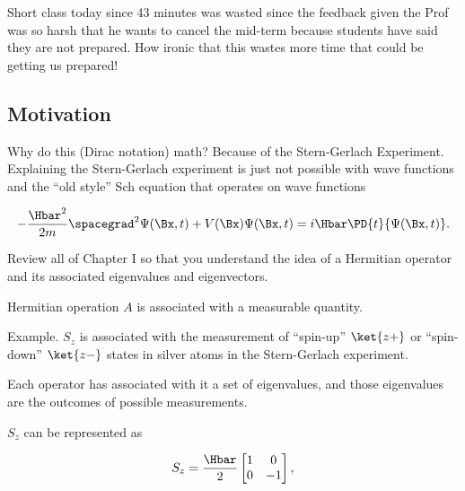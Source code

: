 %
%

Short class today since 43 minutes was wasted since the feedback given the Prof was so harsh that he wants to cancel the mid-term because students have said they are not prepared.  How ironic that this wastes more time that could be getting us prepared!

\subsection{Motivation}

Why do this (Dirac notation) math?  Because of the Stern-Gerlach Experiment.  Explaining the Stern-Gerlach experiment is just not possible with wave functions and the ``old style'' Sch equation that operates on wave functions

\begin{equation}\label{eqn:PHY356Foct26:100}
\begin{aligned}
- \frac{\Hbar^2}{2m} \spacegrad^2 \Psi(\Bx,t) + V(\Bx) \Psi(\Bx,t) = i \Hbar \PD{t}{\Psi(\Bx,t)}.
\end{aligned}
\end{equation}

Review all of Chapter I so that you understand the idea of a Hermitian operator and its associated eigenvalues and eigenvectors.

Hermitian operation \(A\) is associated with a measurable quantity.

Example.  \(S_z\) is associated with the measurement of ``spin-up'' \(\ket{z+}\) or ``spin-down'' \(\ket{z-}\) states in silver atoms in the Stern-Gerlach experiment.

Each operator has associated with it a set of eigenvalues, and those eigenvalues are the outcomes of possible measurements.

\(S_z\) can be represented as

\begin{equation}\label{eqn:PHY356Foct26:101}
\begin{aligned}
S_z = \frac{\Hbar}{2}
\begin{bmatrix}
1 & 0 \\
0 & -1
\end{bmatrix},
\end{aligned}
\end{equation}

